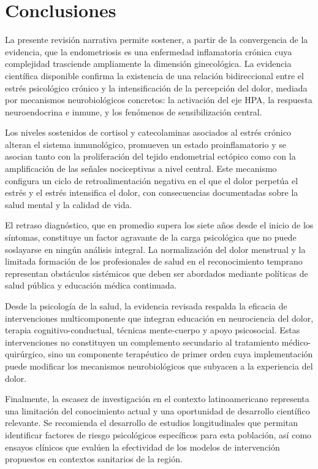 \documentclass[12pt, a4paper]{article}
\begin{document}
\section{Conclusiones}

La presente revisión narrativa permite sostener, a partir de la convergencia de la evidencia, que la endometriosis es una
enfermedad inflamatoria crónica cuya complejidad trasciende ampliamente la dimensión
ginecológica. La evidencia científica disponible confirma la existencia de una relación
bidireccional entre el estrés psicológico crónico y la intensificación de la percepción del
dolor, mediada por mecanismos neurobiológicos concretos: la activación del eje HPA, la
respuesta neuroendocrina e inmune, y los fenómenos de sensibilización central.

Los niveles sostenidos de cortisol y catecolaminas asociados al estrés crónico alteran el
sistema inmunológico, promueven un estado proinflamatorio y se asocian tanto con la proliferación
del tejido endometrial ectópico como con la amplificación de las señales nociceptivas a nivel
central. Este mecanismo configura un ciclo de retroalimentación negativa en el que el dolor
perpetúa el estrés y el estrés intensifica el dolor, con consecuencias documentadas sobre la
salud mental y la calidad de vida.

El retraso diagnóstico, que en promedio supera los siete años desde el inicio de los síntomas,
constituye un factor agravante de la carga psicológica que no puede soslayarse en ningún
análisis integral. La normalización del dolor menstrual y la limitada formación de los
profesionales de salud en el reconocimiento temprano representan obstáculos sistémicos que
deben ser abordados mediante políticas de salud pública y educación médica continuada.

Desde la psicología de la salud, la evidencia revisada respalda la eficacia de intervenciones
multicomponente que integran educación en neurociencia del dolor, terapia cognitivo-conductual,
técnicas mente-cuerpo y apoyo psicosocial. Estas intervenciones no constituyen un complemento
secundario al tratamiento médico-quirúrgico, sino un componente terapéutico de primer orden
cuya implementación puede modificar los mecanismos neurobiológicos que subyacen a la
experiencia del dolor.

Finalmente, la escasez de investigación en el contexto latinoamericano representa una limitación
del conocimiento actual y una oportunidad de desarrollo científico relevante. Se recomienda el
desarrollo de estudios longitudinales que permitan identificar factores de riesgo psicológicos
específicos para esta población, así como ensayos clínicos que evalúen la efectividad de los
modelos de intervención propuestos en contextos sanitarios de la región.
\end{document}
